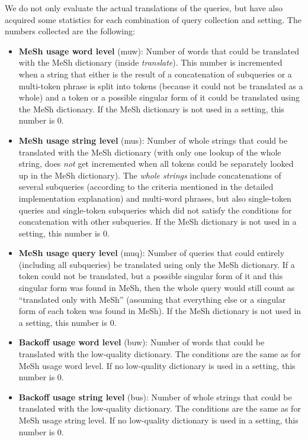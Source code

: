 \documentclass[a4paper,11pt]{article}
\begin{document}
	We do not only evaluate the actual translations of the queries, but have also acquired some statistics for each combination of query collection and setting. The numbers collected are the following:
	\begin{itemize}
		\item \textbf{MeSh usage word level} (muw): Number of words that could be translated with the MeSh dictionary (inside \textit{translate}). This number is incremented when a string that either is the result of a concatenation of subqueries or a multi-token phrase is split into tokens (because it could not be translated as a whole) and a token or a possible singular form of it could be translated using the MeSh dictionary. If the MeSh dictionary is not used in a setting, this number is 0. 
		\item \textbf{MeSh usage string level} (mus): Number of whole strings that could be translated with the MeSh dictionary (with only one lookup of the whole string, does \textit{not} get incremented when all tokens could be separately looked up in the MeSh dictionary). The \textit{whole strings} include concatenations of several subqueries (according to the criteria mentioned in the detailed implementation explanation) and multi-word phrases, but also single-token queries and single-token subqueries which did not satisfy the conditions for concatenation with other subqueries. If the MeSh dictionary is not used in a setting, this number is 0. 
		\item \textbf{MeSh usage query level} (muq): Number of queries that could entirely (including all subqueries) be translated using only the MeSh dictionary. If a token could not be translated, but a possible singular form of it and this singular form was found in MeSh, then the whole query would still count as ``translated only with MeSh'' (assuming that everything else or a singular form of each token was found in MeSh). If the MeSh dictionary is not used in a setting, this number is 0. 
		\item \textbf{Backoff usage word level} (buw): Number of words that could be translated with the low-quality dictionary. The conditions are the same as for MeSh usage word level. If no low-quality dictionary is used in a setting, this number is 0.
		\item \textbf{Backoff usage string level} (bus): Number of whole strings that could be translated with the low-quality dictionary. The conditions are the same as for MeSh usage string level. If no low-quality dictionary is used in a setting, this number is 0.

\end{itemize}
\end{document}

